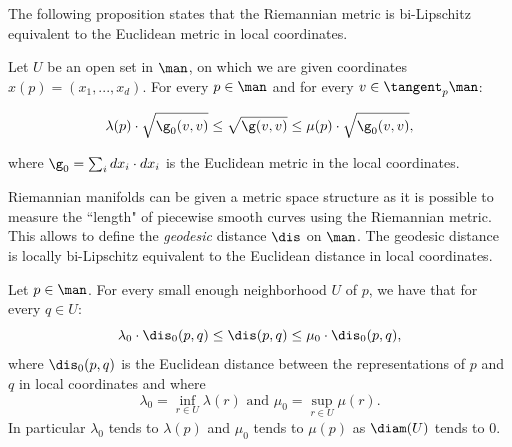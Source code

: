 The following proposition states that the Riemannian metric is bi-Lipschitz equivalent to the Euclidean metric in local coordinates.

\begin{proposition}\label{prop:g_equiv}
Let $U$ be an open set in $\man$, on which we are given coordinates $x(p)=(x_1,...,x_d)$. 
%
For every $p\in\man$ and for every $v\in\tangent_p\man$:

$$\lambda(p)\cdot \sqrt{\g_0(v,v)}\leq \sqrt{\g(v,v)}\leq \mu(p)\cdot \sqrt{\g_0(v,v)},$$

where $\g_0=\sum_{i}dx_i\cdot dx_i$ is the Euclidean metric in the local coordinates.
\end{proposition}

Riemannian manifolds can be given a metric space structure as it is possible to measure the ``length" of piecewise smooth curves using the Riemannian metric. This allows to define the {\it geodesic} distance $\dis$ on $\man$. 
The geodesic distance is locally bi-Lipschitz equivalent to the Euclidean distance in local coordinates.

\begin{proposition}\label{prop:dis_equiv}Let $p\in\man$. For every small enough neighborhood $U$ of $p$, we have that for every $q\in U$:
$$\lambda_0\cdot\dis_0(p,q)\leq \dis(p,q)\leq\mu_0\cdot\dis_0(p,q),$$
where $\dis_0(p,q)$ is the Euclidean distance between the representations of $p$ and $q$ in local coordinates and where
$$\lambda_0=\inf_{r\in U}\lambda(r) \textrm{ and }
\mu_0=\sup_{r\in U}\mu(r).$$
In particular $\lambda_0$ tends to $ \lambda(p)$ and
$\mu_0$  tends to  $\mu(p)$ as $\diam(U)$ tends to $0$.
\end{proposition}











